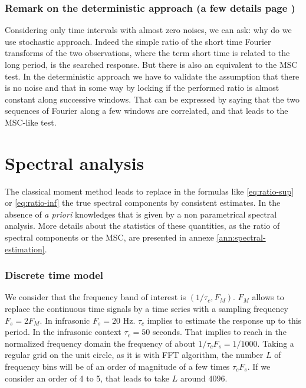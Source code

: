 \subsubsection{Remark on the deterministic approach (a few details page \pageref{ann:deterministic-approach})}
Considering only time intervals with almost zero noises, we can ask: why do we use stochastic approach. Indeed the simple ratio of the short time Fourier transforms of the two observations, where the term short time is related to the long period, is the searched response. But there is also an equivalent to the MSC test. In the deterministic approach we have to validate the assumption that there is no noise and that in some way by locking if the performed ratio is almost constant along successive windows. That can be expressed by saying that the two sequences of Fourier along a few windows are correlated, and that leads to the MSC-like test.

\section{Spectral analysis}
The classical moment method leads to replace in the  formulas like \eqref{eq:ratio-sup}  or \eqref{eq:ratio-inf} the true spectral components by consistent estimates. In the absence of {\it a priori} knowledges that is given by a non parametrical spectral analysis. More details about the statistics of these quantities, as  the ratio of spectral components or the MSC, are presented in annexe \ref{ann:spectral-estimation}. 


\subsubsection{Discrete time model}
We consider that the frequency band of interest is $(1/\tau_{c}, F_{M})$. $F_{M}$ allows to replace the continuous time signals by a time series with a sampling frequency $F_{s}=2F_{M}$. In infrasonic $F_{s}=20$ Hz. $\tau_{c}$ implies to estimate the response up to this period. In the infrasonic context $\tau_{c}=50$ seconds. That implies to reach in the normalized frequency domain the frequency of about $1/\tau_{c}F_{s}=1/1000$. Taking a regular grid on the unit circle, as it is with FFT algorithm, the number $L$ of frequency bins will be of an order of magnitude of a few times $\tau_{c}F_{s}$. If we consider an order of 4 to 5, that leads to take $L$ around $4096$.


